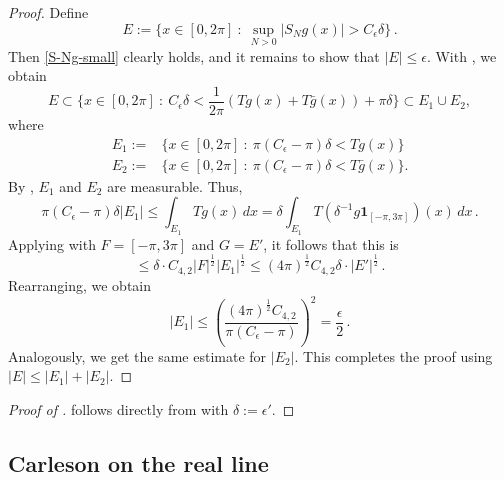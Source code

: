 \documentclass[10pt,a4paper]{article}
\theoremstyle{plain}
\theoremstyle{definition}
\numberwithin{equation}{subsection}
\newcommand{\proves}[1]{}
\newcommand{\leanok}{}
\begin{document}
\begin{proof}
\leanok
Define
\begin{equation*}
    E := \{x \in [0, 2\pi] \ : \ \sup_{N > 0} |S_N g (x)| > C_\epsilon \delta \} \,.
\end{equation*}
Then \eqref{S-Ng-small} clearly holds, and it remains to show that $|E| \le \epsilon$.
With , we obtain
\begin{equation*}
    E \subset \{x\in [0,2\pi] \ : \ C_\epsilon \delta < \frac{1}{2\pi} (Tg(x) + T\bar{g}(x)) + \pi\delta\} \subset E_1 \cup E_2,
\end{equation*}
where
\begin{align*}
    E_1 :=& \{x\in [0,2\pi] \ : \ \pi(C_\epsilon - \pi) \delta < Tg(x)\} \\
    E_2 :=& \{x\in [0,2\pi] \ : \ \pi(C_\epsilon - \pi) \delta < T\bar{g}(x)\}.
\end{align*}
By , $E_1$ and $E_2$ are measurable. Thus,
\begin{equation*}
    \pi(C_\epsilon - \pi) \delta |E_1| \le \int_{E_1} Tg(x) \, dx = \delta \int_{E_1} T(\delta^{-1} g\mathbf{1}_{[-\pi,3\pi]})(x) \, dx \,.
\end{equation*}
Applying  with $F = [-\pi, 3\pi]$ and $G = E'$, it follows that this is
\begin{equation*}
    \le \delta \cdot C_{4,2} |F|^{\frac{1}{2}} |E_1|^{\frac{1}{2}} \le (4\pi)^\frac{1}{2} C_{4,2} \delta \cdot |E'|^{\frac{1}{2}}\,.
\end{equation*}
Rearranging, we obtain
\begin{equation*}
    |E_1| \le \left(\frac{(4\pi)^\frac{1}{2} C_{4,2}}{\pi(C_\epsilon - \pi)}\right)^2 = \frac{\epsilon}{2}\,.
\end{equation*}
Analogously, we get the same estimate for $|E_2|$. This completes the proof using $|E| \le |E_1| + |E_2|$.
\end{proof}

\begin{proof}[Proof of ]
\proves{control-approximation-effect}
\leanok
     follows directly from  with $\delta:=\epsilon'$.
\end{proof}




\subsection{Carleson on the real line}
\label{10carleson}
\end{document}
